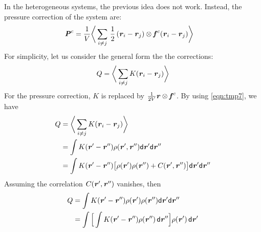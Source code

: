 \documentclass[aps,pre,preprint]{revtex4}
\renewcommand{\v}[1]{\textbf{\textit{#1}}}
\renewcommand{\d}[1]{\textsf{#1}}
\begin{document}
In the heterogeneous systems, the previous idea does not
work. Instead, the pressure correction of the
system are:
\begin{align}
  \v P^c &= \frac1{V} \bigg\langle \sum_{i\neq j}\,\frac12\, (\v r_i - \v r_j) \otimes \v f^c(\v r_i - \v r_j) \bigg\rangle
\end{align}
For simplicity, let us consider the general form the the corrections:
\begin{align}
  Q = \bigg\langle \sum_{i\neq j} K(\v r_i - \v r_j) \bigg\rangle
\end{align}
For the pressure correction, $K$ is replaced by $\frac{1}{2V}\v
r\otimes\v f^c$.  By using \eqref{eqn:tmp7}, we have
\begin{align}\nonumber
  Q
  &= \bigg\langle \sum_{i\neq j} K(\v r_i - \v r_j) \bigg\rangle\\\nonumber
  & = \int K(\v r' - \v r'') \rho(\v r', \v r'') \d d\v r'\d d\v r'' \\\nonumber
  & = \int K(\v r' - \v r'')
  \big[
  \rho(\v r') \rho(\v r'') + C(\v r', \v r'')
  \big]
  \d d\v r'\d d\v r''
\end{align}
Assuming the correlation $C(\v r', \v r'')$ vanishes, then
\begin{align} \nonumber
  Q 
  & = \int K(\v r' - \v r'')
  \rho(\v r') \rho(\v r'') 
  \d d\v r'\d d\v r'' \\
  & = \int
  \Big[
  \int K(\v r' - \v r'') \rho(\v r'')\,\d d\v r''
  \Big]
  \rho(\v r')\,\d d\v r'
\end{align}
\end{document}
